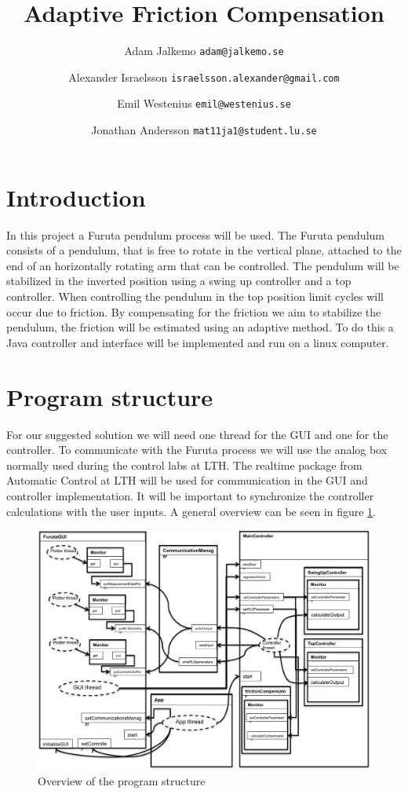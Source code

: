 \documentclass[10pt,a4paper]{article}
\author{Adam Jalkemo \texttt{adam@jalkemo.se} \and
Alexander Israelsson \texttt{israelsson.alexander@gmail.com} \and
Emil Westenius \texttt{emil@westenius.se} \and
Jonathan Andersson \texttt{mat11ja1@student.lu.se}}
\title{Adaptive Friction Compensation}
\begin{document}
\maketitle

\section{Introduction}
In this project a Furuta pendulum process will be used. The Furuta pendulum consists of a pendulum, that is free to rotate in the vertical plane, attached to the end of an horizontally rotating arm that can be controlled. The pendulum will be stabilized in the inverted position using a swing up controller and a top controller. When controlling the pendulum in the top position limit cycles will occur due to friction. By compensating for the friction we aim to stabilize the pendulum, the friction will be estimated using an adaptive method. To do this a Java controller and interface will be implemented and run on a linux computer.
\section{Program structure}
For our suggested solution we will need one thread for the GUI and one for the controller. To communicate with the Furuta process we will use the analog box normally used during the control labs at LTH. The realtime package from Automatic Control at LTH will be used for communication in the GUI and controller implementation. It will be important to synchronize the controller calculations with the user inputs. A general overview can be seen in figure \ref{fig:uml}.
\begin{figure}[H]
\centerline{\includegraphics[scale=0.7]{notUml.png}}
\caption{Overview of the program structure}
\label{fig:uml}
\end{figure}
\end{document}
